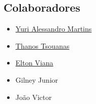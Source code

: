 \documentclass[12pt, a4paper]{article}
\begin{document}
\subsection{Colaboradores}
\begin{itemize}
\item \href{https://github.com/YuriAlessandro}{Yuri Alessandro Martins}
\item \href{http://www.tsouanas.org/}{Thanos Tsouanas}
\item \href{https://github.com/eltonvs}{Elton Viana}
\item Gilney Junior
\item João Victor
\end{itemize}
\clearpage


\end{document}
